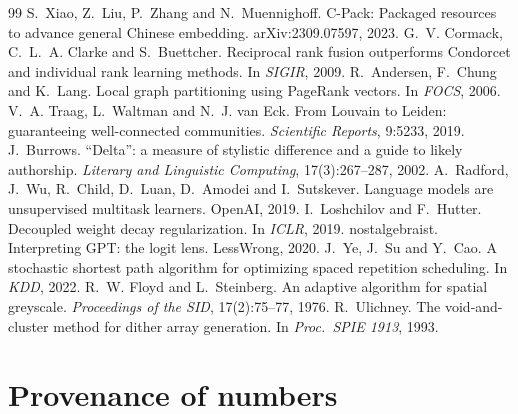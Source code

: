\documentclass[11pt]{article}
\begin{document}
\begin{thebibliography}{99}
 S.~Xiao, Z.~Liu, P.~Zhang and N.~Muennighoff. C-Pack: Packaged
  resources to advance general Chinese embedding. arXiv:2309.07597, 2023.
 G.~V. Cormack, C.~L.~A. Clarke and S.~Buettcher. Reciprocal rank
  fusion outperforms Condorcet and individual rank learning methods. In
  \emph{SIGIR}, 2009.
 R.~Andersen, F.~Chung and K.~Lang. Local graph partitioning using
  PageRank vectors. In \emph{FOCS}, 2006.
 V.~A. Traag, L.~Waltman and N.~J. van Eck. From Louvain to
  Leiden: guaranteeing well-connected communities. \emph{Scientific Reports},
  9:5233, 2019.
 J.~Burrows. \enquote{Delta}: a measure of stylistic difference
  and a guide to likely authorship. \emph{Literary and Linguistic Computing},
  17(3):267--287, 2002.
 A.~Radford, J.~Wu, R.~Child, D.~Luan, D.~Amodei and I.~Sutskever.
  Language models are unsupervised multitask learners. OpenAI, 2019.
 I.~Loshchilov and F.~Hutter. Decoupled weight decay
  regularization. In \emph{ICLR}, 2019.
 nostalgebraist. Interpreting GPT: the logit lens.
  LessWrong, 2020.
 J.~Ye, J.~Su and Y.~Cao. A stochastic shortest path algorithm
  for optimizing spaced repetition scheduling. In \emph{KDD}, 2022.
 R.~W. Floyd and L.~Steinberg. An adaptive algorithm for spatial
  greyscale. \emph{Proceedings of the SID}, 17(2):75--77, 1976.
 R.~Ulichney. The void-and-cluster method for dither array
  generation. In \emph{Proc.\ SPIE 1913}, 1993.
\end{thebibliography}

\appendix
\section{Provenance of numbers}\label{app:provenance}
\end{document}
